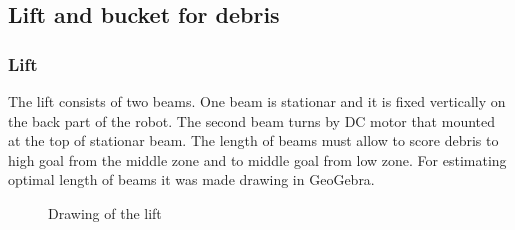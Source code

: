 \subsection{Lift and bucket for debris}

\subsubsection{Lift}
The lift consists of two beams. One beam is stationar and it is fixed vertically on the back part of the robot. The second beam turns by DC motor that mounted at the top of stationar beam. The length of beams must allow to score debris to high goal from the middle zone and to middle goal from low zone.	\newline
For estimating optimal length of beams it was made drawing in GeoGebra.
\begin{figure}[H]
	\begin{minipage}[h]{1\linewidth}
		\caption{Drawing of the lift}
	\end{minipage}
\end{figure}

